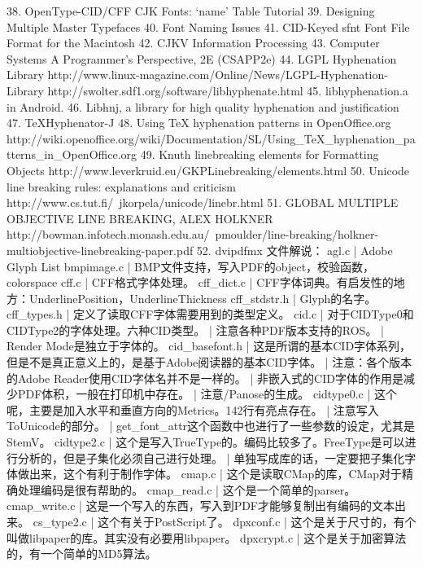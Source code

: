 38. OpenType-CID/CFF CJK Fonts: ‘name’ Table Tutorial
39. Designing Multiple Master Typefaces
40. Font Naming Issues
41. CID-Keyed sfnt Font File Format for the Macintosh
42. CJKV Information Processing
43. Computer Systems A Programmer's Perspective, 2E (CSAPP2e)
44. LGPL Hyphenation Library
    http://www.linux-magazine.com/Online/News/LGPL-Hyphenation-Library
    http://swolter.sdf1.org/software/libhyphenate.html
45. libhyphenation.a in Android.
46. Libhnj, a library for high quality hyphenation and justification
47. TeXHyphenator-J
48. Using TeX hyphenation patterns in OpenOffice.org
    http://wiki.openoffice.org/wiki/Documentation/SL/Using_TeX_hyphenation_patterns_in_OpenOffice.org
49. Knuth linebreaking elements for Formatting Objects
    http://www.leverkruid.eu/GKPLinebreaking/elements.html
50. Unicode line breaking rules: explanations and criticism
    http://www.cs.tut.fi/~jkorpela/unicode/linebr.html
51. GLOBAL MULTIPLE OBJECTIVE LINE BREAKING, ALEX HOLKNER
    http://bowman.infotech.monash.edu.au/~pmoulder/line-breaking/holkner-multiobjective-linebreaking-paper.pdf
52. dvipdfmx 文件解说：
    agl.c | Adobe Glyph List
    bmpimage.c | BMP文件支持，写入PDF的object，校验函数，colorspace
    cff.c | CFF格式字体处理。
    cff_dict.c | CFF字体词典。有启发性的地方：UnderlinePosition，UnderlineThickness
    cff_stdstr.h | Glyph的名字。
    cff_types.h | 定义了读取CFF字体需要用到的类型定义。
    cid.c | 对于CIDType0和CIDType2的字体处理。六种CID类型。
          | 注意各种PDF版本支持的ROS。
          | Render Mode是独立于字体的。
    cid_basefont.h | 这是所谓的基本CID字体系列，但是不是真正意义上的，是基于Adobe阅读器的基本CID字体。
                   | 注意：各个版本的Adobe Reader使用CID字体名并不是一样的。
                   | 非嵌入式的CID字体的作用是减少PDF体积，一般在打印机中存在。
                   | 注意/Panose的生成。
    cidtype0.c | 这个呢，主要是加入水平和垂直方向的Metrics。142行有亮点存在。
               | 注意写入ToUnicode的部分。
               | get_font_attr这个函数中也进行了一些参数的设定，尤其是StemV。
    cidtype2.c | 这个是写入TrueType的。编码比较多了。FreeType是可以进行分析的，但是子集化必须自己进行处理。
               | 单独写成库的话，一定要把子集化字体做出来，这个有利于制作字体。
    cmap.c | 这个是读取CMap的库，CMap对于精确处理编码是很有帮助的。
    cmap_read.c | 这个是一个简单的parser。
    cmap_write.c | 这是一个写入的东西，写入到PDF才能够复制出有编码的文本出来。
    cs_type2.c | 这个有关于PostScript了。
    dpxconf.c | 这个是关于尺寸的，有个叫做libpaper的库。其实没有必要用libpaper。
    dpxcrypt.c | 这个是关于加密算法的，有一个简单的MD5算法。

